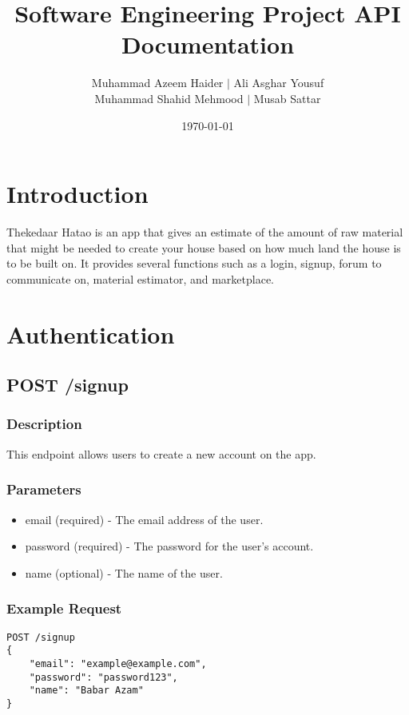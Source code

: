 \documentclass{article}
\title{Software Engineering Project API Documentation}
\author{Muhammad Azeem Haider $\mid$ Ali Asghar Yousuf \\
      Muhammad Shahid Mehmood $\mid$ Musab Sattar}
\date{\today}
\begin{document}
\maketitle

\section{Introduction}

Thekedaar Hatao is an app that gives an estimate of the amount of raw material that might be needed to create your house based on how much land the house is to be built on. It provides several functions such as a login, signup, forum to communicate on, material estimator, and marketplace.

\section{Authentication}

\subsection{POST /signup}

\subsubsection{Description}

This endpoint allows users to create a new account on the app.

\subsubsection{Parameters}

\begin{itemize}
\item email (required) - The email address of the user.
\item password (required) - The password for the user's account.
\item name (optional) - The name of the user.
\end{itemize}

\subsubsection{Example Request}

\begin{verbatim}
POST /signup
{
    "email": "example@example.com",
    "password": "password123",
    "name": "Babar Azam"
}
\end{verbatim}
\end{document}
